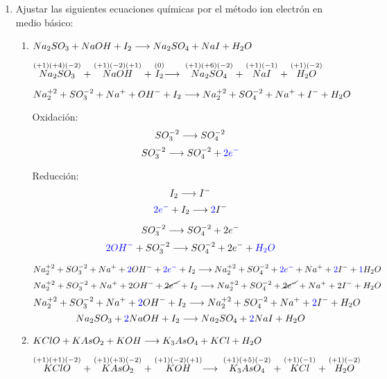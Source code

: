 \documentclass[../practica.root.tex]{subfiles}
\begin{document}
\begin{enumerate}
	\item Ajustar las siguientes ecuaciones químicas por el método ion electrón en medio básico:
	      \begin{enumerate}
		      \item $Na_2SO_3 + NaOH + I_2 \longrightarrow{} Na_2SO_4 + NaI + H_2O$

		            $\stackrel{(+1)(+4)(-2)}{Na_2SO_3} + \stackrel{(+1)(-2)(+1)}{NaOH} + \stackrel{(0)}{I_2}
			            \longrightarrow{} \stackrel{(+1)(+6)(-2)}{Na_2SO_4} + \stackrel{(+1)(-1)}{NaI} + \stackrel{(+1)(-2)}{H_2O}$

		            \[ Na_2^{+2} + SO_3^{-2} + Na^+ + OH^- + I_2 \longrightarrow{} Na_2^{+2} + SO_4^{-2} + Na^+ + I^- + H_2O \]

		            \begin{multicols}{2}
			            Oxidación:
			            \[ SO_3^{-2} \longrightarrow{} SO_4^{-2} \]
			            \[ SO_3^{-2} \longrightarrow{} SO_4^{-2} + \textcolor{blue}{2e^-} \]

			            \columnbreak

			            Reducción:
			            \[ I_2 \longrightarrow{} I^- \]
			            \[ \textcolor{blue}{2e^-} + I_2 \longrightarrow{} \textcolor{blue}{2} I^- \]
		            \end{multicols}


		            \[ SO_3^{-2} \longrightarrow{} SO_4^{-2} + 2 e^- \]
		            \[ \textcolor{blue}{2 OH^-} + SO_3^{-2} \longrightarrow{} SO_4^{-2} + 2 e^- + \textcolor{blue}{H_2O} \]

		            \[ Na_2^{+2} + SO_3^{-2} + Na^+ + \textcolor{blue}{2} OH^- + \textcolor{blue}{2 e^-} + I_2 \\
			            \longrightarrow{} Na_2^{+2} + SO_4^{-2} + \textcolor{blue}{2 e^-} + Na^+ + \textcolor{blue}{2} I^- + \textcolor{blue}{1} H_2O \]
		            \[ Na_2^{+2} + SO_3^{-2} + Na^+ + 2 OH^- + \cancel{2 e^-} + I_2 \\
			            \longrightarrow{} Na_2^{+2} + SO_4^{-2} + \cancel{2 e^-} + Na^+ + 2 I^- + H_2O \]
		            \[ Na_2^{+2} + SO_3^{-2} + Na^+ + \textcolor{blue}{2} OH^- + I_2 \\
			            \longrightarrow{} Na_2^{+2} + SO_4^{-2} + Na^+ + \textcolor{blue}{2} I^- + H_2O \]
		            \[ Na_2SO_3 + \textcolor{blue}{2} NaOH + I_2 \longrightarrow{} Na_2SO_4 + \textcolor{blue}{2} NaI + H_2O \]

		      \item $KClO + KAsO_2 + KOH \longrightarrow{} K_3AsO_4 + KCl + H_2O$

		            $\stackrel{(+1)(+1)(-2)}{KClO} + \stackrel{(+1)(+3)(-2)}{KAsO_2} + \stackrel{(+1)(-2)(+1)}{KOH}
			            \longrightarrow{} \stackrel{(+1)(+5)(-2)}{K_3AsO_4} + \stackrel{(+1)(-1)}{KCl} + \stackrel{(+1)(-2)}{H_2O}$


\end{enumerate}
\end{enumerate}
\end{document}
